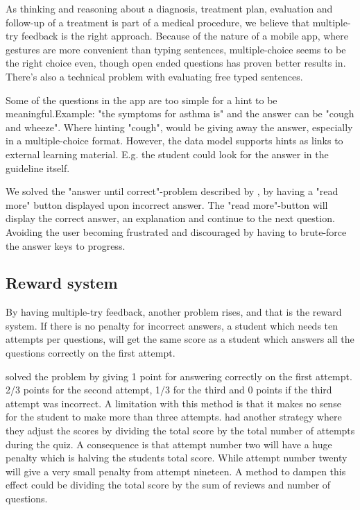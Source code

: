 

As thinking and reasoning about a diagnosis, treatment plan, evaluation and follow-up of a treatment is part of a medical procedure, we believe that multiple-try feedback is the right approach. Because of the nature of a mobile app, where gestures are more convenient than typing sentences, multiple-choice seems to be the right choice even, though open ended questions has proven better results in. There's also a technical problem with evaluating free typed sentences.

Some of the questions in the app are too simple for a hint to be meaningful.Example: "the symptoms for asthma is" and the answer can be "cough and wheeze". Where hinting "cough", would be giving away the answer, especially in a multiple-choice format. However, the data model supports hints as links to external learning material. E.g. the student could look for the answer in the guideline itself.

We solved the "answer until correct"-problem described by \textcite{Morrison1995}, by having a "read more" button displayed upon incorrect answer. The "read more"-button will display the correct answer, an explanation and continue to the next question. Avoiding the user becoming frustrated and discouraged by having to brute-force the answer keys to progress.




\subsection{Reward system}
By having multiple-try feedback, another problem rises, and that is the reward system. If there is no penalty for incorrect answers, a student which needs ten attempts per questions, will get the same score as a student which answers all the questions correctly on the first attempt.

\textcite{Attali2015} solved the problem by giving 1 point for answering correctly on the first attempt. 2/3 points for the second attempt, 1/3 for the third and 0 points if the third attempt was incorrect. A limitation with this method is that it makes no sense for the student to make more than three attempts. \textcite{Morrison1995} had another strategy where they adjust the scores by dividing the total score by the total number of attempts during the quiz. A consequence is that attempt number two will have a huge penalty which is halving the students total score. While attempt number twenty will give a very small penalty from attempt nineteen. A method to dampen this effect could be dividing the total score by the sum of reviews and number of questions.

